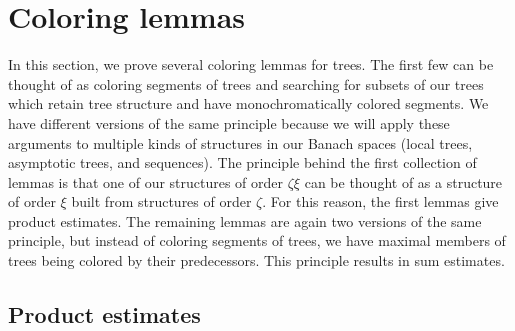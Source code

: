 \documentclass[12pt]{amsart}
\theoremstyle{definition}
\begin{document}
\section{Coloring lemmas}


In this section, we prove several coloring lemmas for trees.  The first few can be thought of as coloring segments of trees and searching for subsets of our trees which retain tree structure and have monochromatically colored segments.  We have different versions of the same principle because we will apply these arguments to multiple kinds of structures in our Banach spaces (local trees, asymptotic trees, and sequences).  The principle behind the first collection of lemmas is that one of our structures of order $\zeta\xi$ can be thought of as a structure of order $\xi$ built from structures of order $\zeta$. For this reason, the first  lemmas give product estimates.  The remaining lemmas are again two versions of the same principle, but instead of coloring segments of trees, we have maximal members of trees being colored by their predecessors.  This principle results in sum estimates.  



\subsection{Product estimates}
\end{document}
